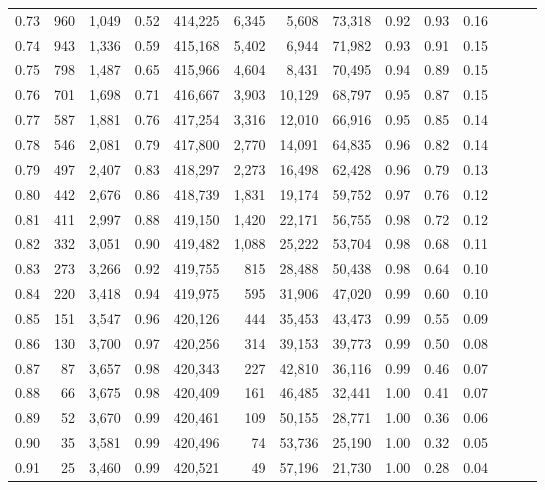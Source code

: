 \begin{tabular}{rrrrrrrrrrrrrr}
0.73 &    960 &  1,049 &  0.52 &  414,225 &    6,345 &   5,608 &  73,318 &  0.92 &  0.93 &      0.16 \\
0.74 &    943 &  1,336 &  0.59 &  415,168 &    5,402 &   6,944 &  71,982 &  0.93 &  0.91 &      0.15 \\
0.75 &    798 &  1,487 &  0.65 &  415,966 &    4,604 &   8,431 &  70,495 &  0.94 &  0.89 &      0.15 \\
0.76 &    701 &  1,698 &  0.71 &  416,667 &    3,903 &  10,129 &  68,797 &  0.95 &  0.87 &      0.15 \\
0.77 &    587 &  1,881 &  0.76 &  417,254 &    3,316 &  12,010 &  66,916 &  0.95 &  0.85 &      0.14 \\
0.78 &    546 &  2,081 &  0.79 &  417,800 &    2,770 &  14,091 &  64,835 &  0.96 &  0.82 &      0.14 \\
0.79 &    497 &  2,407 &  0.83 &  418,297 &    2,273 &  16,498 &  62,428 &  0.96 &  0.79 &      0.13 \\
0.80 &    442 &  2,676 &  0.86 &  418,739 &    1,831 &  19,174 &  59,752 &  0.97 &  0.76 &      0.12 \\
0.81 &    411 &  2,997 &  0.88 &  419,150 &    1,420 &  22,171 &  56,755 &  0.98 &  0.72 &      0.12 \\
0.82 &    332 &  3,051 &  0.90 &  419,482 &    1,088 &  25,222 &  53,704 &  0.98 &  0.68 &      0.11 \\
0.83 &    273 &  3,266 &  0.92 &  419,755 &      815 &  28,488 &  50,438 &  0.98 &  0.64 &      0.10 \\
0.84 &    220 &  3,418 &  0.94 &  419,975 &      595 &  31,906 &  47,020 &  0.99 &  0.60 &      0.10 \\
0.85 &    151 &  3,547 &  0.96 &  420,126 &      444 &  35,453 &  43,473 &  0.99 &  0.55 &      0.09 \\
0.86 &    130 &  3,700 &  0.97 &  420,256 &      314 &  39,153 &  39,773 &  0.99 &  0.50 &      0.08 \\
0.87 &     87 &  3,657 &  0.98 &  420,343 &      227 &  42,810 &  36,116 &  0.99 &  0.46 &      0.07 \\
0.88 &     66 &  3,675 &  0.98 &  420,409 &      161 &  46,485 &  32,441 &  1.00 &  0.41 &      0.07 \\
0.89 &     52 &  3,670 &  0.99 &  420,461 &      109 &  50,155 &  28,771 &  1.00 &  0.36 &      0.06 \\
0.90 &     35 &  3,581 &  0.99 &  420,496 &       74 &  53,736 &  25,190 &  1.00 &  0.32 &      0.05 \\
0.91 &     25 &  3,460 &  0.99 &  420,521 &       49 &  57,196 &  21,730 &  1.00 &  0.28 &      0.04 \\

\end{tabular}
